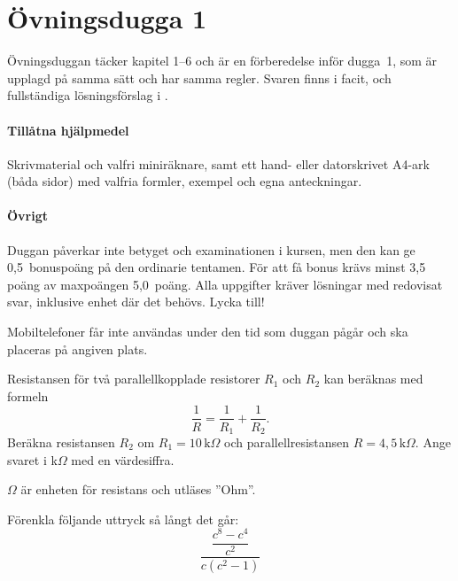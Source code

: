 
\clearpage
\section{Övningsdugga 1}
\label{c6:sec:ovningsdugga}
Övningsduggan täcker kapitel 1--6 och är en förberedelse inför dugga~1, som är upplagd på samma
sätt och har samma regler. Svaren finns i facit, och fullständiga lösningsförslag i
.

\paragraph{Tillåtna hjälpmedel} Skrivmaterial och valfri miniräknare, samt ett hand- eller
datorskrivet A4-ark (båda sidor) med valfria formler, exempel och egna anteckningar.

\paragraph{Övrigt} Duggan påverkar inte betyget och examinationen i kursen, men den kan ge
0,5~bonuspoäng på den ordinarie tentamen. För att få bonus krävs minst 3,5 poäng av maxpoängen
5,0~poäng. Alla uppgifter kräver lösningar med redovisat svar, inklusive enhet där det behövs.
Lycka till!

\begin{aside}
\note[Obs] Mobiltelefoner får inte användas under den tid som duggan pågår och ska placeras på
angiven plats.
\end{aside}


Resistansen för två parallellkopplade resistorer $R_1$ och $R_2$ kan beräknas med formeln
\[
  \frac{1}{R} = \frac{1}{R_1} + \frac{1}{R_2}.
\]
Beräkna resistansen $R_2$ om $R_1 = 10\,\text{k}\Omega$ och parallellresistansen
$R = 4{,}5\,\text{k}\Omega$. Ange svaret i k$\Omega$ med en värdesiffra.

\begin{aside}
\note[Notering] $\Omega$ är enheten för resistans och utläses ”Ohm”.
\end{aside}

Förenkla följande uttryck så långt det går:
\[
  \frac{\dfrac{c^8 - c^4}{c^2}}{c(c^2 - 1)}
\]

